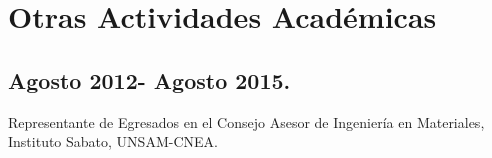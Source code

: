 \section{Otras Actividades Académicas}

\subsection{Agosto 2012- Agosto 2015.} 

Representante de Egresados en el Consejo Asesor de Ingeniería 
en Materiales, Instituto Sabato, UNSAM-CNEA. 

